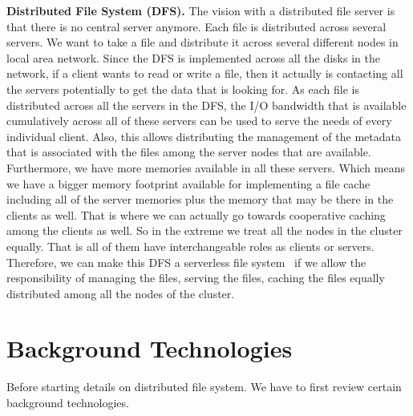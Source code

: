 \documentclass[11pt]{lecture}
\begin{document}
\noindent
{\bf Distributed File System (DFS).} The vision with a distributed file server is that there 
is no central server anymore. Each file is distributed across several servers. We want to take a 
file and distribute it across several different nodes in local area network. Since the DFS 
is implemented across all the disks in the network, if a client wants to read or write a 
file, then it actually is contacting all the servers potentially to get the data that is 
looking for. As each file is distributed across all the servers in the DFS, the I/O bandwidth 
that is available cumulatively across all of these servers can be used to serve the needs of every 
individual client. Also, this allows distributing the management of the metadata that is 
associated with the files among the server nodes that are available. Furthermore, we have 
more memories available in all these servers. Which means we have a bigger memory footprint available 
for implementing a file cache including all of the server memories plus the memory that 
may be there in the clients as well. That is where we can actually go towards cooperative caching 
among the clients as well. So in the extreme we treat all the nodes in the cluster equally. That is 
all of them have interchangeable roles as clients or servers. Therefore, we can make this 
DFS a serverless file system~\cite{AndersonXFS} if we allow the responsibility of managing the files, serving the 
files, caching the files equally distributed among all the nodes of the cluster.


\section{Background Technologies}\label{sec: background}

Before starting details on distributed 
file system. We have to first review certain background technologies.
\end{document}
